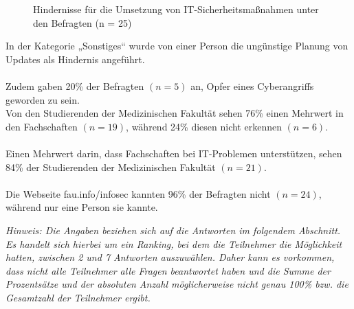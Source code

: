 \documentclass[german,report]{i1thesis}
\begin{document}
\begin{figure}[H]
\centering
{}
\caption{Hindernisse für die Umsetzung von IT-Sicherheitsmaßnahmen unter den Befragten (n = 25)}
\label{fig:hindernisse_it_sicherheit_balken}
\end{figure}

In der Kategorie „Sonstiges“ wurde von einer Person die ungünstige Planung von Updates als Hindernis angeführt.\\
\\
Zudem gaben 20\% der Befragten \((n=5)\) an, Opfer eines Cyberangriffs geworden zu sein.
\\
Von den Studierenden der Medizinischen Fakultät sehen 76\% einen Mehrwert in den Fachschaften \((n=19)\), während 24\% diesen nicht erkennen \((n=6)\).\\
\\
Einen Mehrwert darin, dass Fachschaften bei IT-Problemen unterstützen, sehen 84\% der Studierenden der Medizinischen Fakultät \((n=21)\).\\
\\
Die Webseite fau.info/infosec kannten 96\% der Befragten nicht \((n=24)\), während nur eine Person sie kannte.

\textit{Hinweis: Die Angaben beziehen sich auf die Antworten im folgendem Abschnitt. Es handelt sich hierbei um ein Ranking, bei dem die Teilnehmer die Möglichkeit hatten, zwischen 2 und 7 Antworten auszuwählen. Daher kann es vorkommen, dass nicht alle Teilnehmer alle Fragen beantwortet haben und die Summe der Prozentsätze und der absoluten Anzahl möglicherweise nicht genau 100\% bzw. die Gesamtzahl der Teilnehmer ergibt.}
\end{document}
